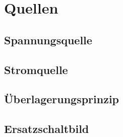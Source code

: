 \chapter{Quellen}

\section{Spannungsquelle}

\section{Stromquelle}

\section{Überlagerungsprinzip}

\section{Ersatzschaltbild}